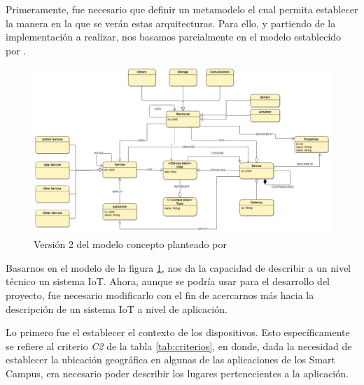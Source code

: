 Primeramente, fue necesario que definir un metamodelo el cual permita establecer la manera en la que se verán estas arquitecturas. Para ello, y partiendo de la implementación a realizar, nos basamos parcialmente en el modelo establecido por . 

\begin{figure}[H]
    \centering
    \caption{Versión 2 del modelo concepto planteado por}
    \label{fig:henrymodelo}
    \vspace{2mm}

    \includegraphics[width=\linewidth]{images/Henrymodelo.png}
\end{figure}



Basarnos en el modelo de la figura \ref{fig:henrymodelo}, nos da la capacidad de describir a un nivel técnico un sistema IoT. Ahora, aunque se podría usar para el desarrollo del proyecto, fue necesario modificarlo con el fin de acercarnos más hacia la descripción de un sistema IoT a nivel de aplicación. 

Lo primero fue el establecer el contexto de los dispositivos. Esto específicamente se refiere al criterio \textit{C2} de la tabla \ref{tab:criterios}, en donde, dada la necesidad de establecer la ubicación geográfica en algunas de las aplicaciones de los Smart Campus, era necesario poder describir los lugares pertenecientes a la aplicación.

